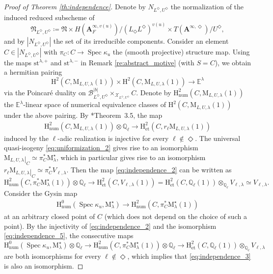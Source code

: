 \documentclass[12pt]{amsart}
\numberwithin{equation}{section}
\theoremstyle{plain}
\theoremstyle{definition}
\theoremstyle{remark}
\renewcommand{\b}[1]{\mathbf{#1}}
\renewcommand{\c}[1]{\mathcal{#1}}
\renewcommand{\d}[1]{\mathbb{#1}}
\newcommand{\f}[1]{\mathfrak{#1}}
\renewcommand{\r}[1]{\mathrm{#1}}
\renewcommand{\(}{\left(}
\renewcommand{\)}{\right)}
\newcommand{\res}{\mathbin{|}}
\newcommand{\bA}{\b A}
\newcommand{\cB}{\c B}
\newcommand{\cX}{\c X}
\newcommand{\dE}{\d E}
\newcommand{\dQ}{\d Q}
\newcommand{\fN}{\f N}
\newcommand{\rH}{\r H}
\newcommand{\rM}{\r M}
\newcommand{\et}{{\acute{\r{e}}\r{t}}}
\newcommand{\num}{\r{num}}
\newcommand{\st}{\r{st}}
\DeclareMathOperator{\Spec}{Spec}
\begin{document}
\begin{proof}[Proof of Theorem \ref{th:independence}]
Denote by $N_{L^\Diamond,U^\Diamond}$ the normalization of the induced reduced subscheme of
\[
\fN_{L^\Diamond,U^\Diamond}\coloneqq\fN\times H(\bA_F^{\infty,v(u)})/(L_\Diamond L^\Diamond)^{v(u)}\times T(\bA^{\infty,\Diamond})/U^\Diamond,
\]
and by $|N_{L^\Diamond,U^\Diamond}|$ the set of its irreducible components. Consider an element $C\in|N_{L^\Diamond,U^\Diamond}|$ with $\pi_C\colon C\to\Spec\kappa_u$ the (smooth projective) structure map. Using the maps $\st^{\lambda,+}$ and $\st^{\lambda,-}$ in Remark \ref{re:abstract_motive} (with $S=C$), we obtain a hermitian pairing
\[
\rH^2(C,\rM_{L,U,\lambda}(1))\times\rH^2(C,\rM_{L,U,\lambda}(1))\to\dE^\lambda
\]
via the Poincar\'{e} duality on $\cB_{L^\Diamond,U^\Diamond}^{|b|}\times_{\cX_{L^\Diamond,U^\Diamond}}C$. Denote by $\rH^2_\num(C,\rM_{L,U,\lambda}(1))$ the $\dE^\lambda$-linear space of numerical equivalence classes of $\rH^2(C,\rM_{L,U,\lambda}(1))$ under the above pairing. By \cite{Kle68}*{Theorem~3.5}, the map
\begin{align}\label{eq:independence_2}
\rH^2_\num(C,\rM_{L,U,\lambda}(1))\otimes{\dQ_\ell}\to\rH^2_{\et}(C,r_\ell\rM_{L,U,\lambda}(1))
\end{align}
induced by the $\ell$-adic realization is injective for every $\ell\not\in\Diamond$. The universal quasi-isogeny \eqref{eq:uniformization_2} gives rise to an isomorphism $\rM_{L,U,\lambda}\res_{C}\simeq\pi_{C}^*\rM^\star_\lambda$, which in particular gives rise to an isomorphism $r_\ell\rM_{L,U,\lambda}\res_{C}\simeq\pi_{C}^* V_{\ell,\lambda}$. Then the map \eqref{eq:independence_2} can be written as
\[
\rH^2_\num(C,\pi_{C}^*\rM^\star_\lambda(1))\otimes{\dQ_\ell}\to
\rH^2_{\et}(C,V_{\ell,\lambda}(1))
=\rH^2_{\et}(C,\dQ_\ell(1))\otimes_{\dQ_\ell}V_{\ell,\lambda}\simeq V_{\ell,\lambda}.
\]
Consider the Gysin map
\begin{align}\label{eq:independence_3}
\rH^0_\num(\Spec\kappa_u,\rM^\star_\lambda)\to\rH^2_\num(C,\pi_{C}^*\rM^\star_\lambda(1))
\end{align}
at an arbitrary closed point of $C$ (which does not depend on the choice of such a point). By the injectivity of \eqref{eq:independence_2} and the isomorphism \eqref{eq:independence_5}, the consecutive maps
\[
\rH^0_\num(\Spec\kappa_u,\rM^\star_\lambda)\otimes{\dQ_\ell}
\to\rH^2_\num(C,\pi_{C}^*\rM^\star_\lambda(1))\otimes{\dQ_\ell}
\to\rH^2_{\et}(C,\dQ_\ell(1))\otimes_{\dQ_\ell}V_{\ell,\lambda}
\]
are both isomorphisms for every $\ell\not\in\Diamond$, which implies that \eqref{eq:independence_3} is also an isomorphism.


\end{proof}
\end{document}
